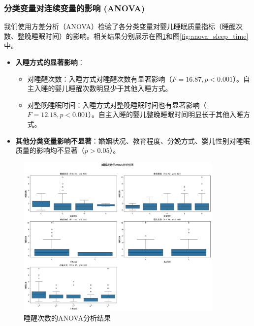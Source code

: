 \documentclass[withoutpreface,bwprint]{cumcmthesis}
\begin{document}
\subsubsection{分类变量对连续变量的影响 (ANOVA)}
我们使用方差分析（ANOVA）检验了各分类变量对婴儿睡眠质量指标（睡醒次数、整晚睡眠时间）的影响。相关结果分别展示在图\ref{fig:anova_wake_up_times}和图\ref{fig:anova_sleep_time}中。
\begin{itemize}
    \item \textbf{入睡方式的显著影响}：
    \begin{itemize}
        \item 对睡醒次数：入睡方式对睡醒次数有显著影响（$F=16.87, p<0.001$）。自主入睡的婴儿睡醒次数明显少于其他入睡方式。
        \item 对整晚睡眠时间：入睡方式对整晚睡眠时间也有显著影响（$F=12.18, p<0.001$）。自主入睡的婴儿整晚睡眠时间明显长于其他入睡方式。
    \end{itemize}
    \item \textbf{其他分类变量影响不显著}：婚姻状况、教育程度、分娩方式、婴儿性别对睡眠质量的影响均不显著（$p>0.05$）。
\end{itemize}

\begin{figure}[htbp]
    \centering
    \includegraphics[width=0.9\textwidth]{figures/anova_睡醒次数_combined.png}
    \caption{睡醒次数的ANOVA分析结果}
    \label{fig:anova_wake_up_times}
\end{figure}
\end{document}
